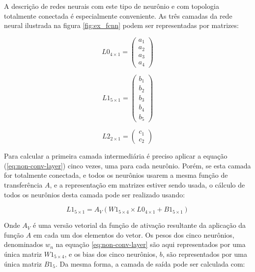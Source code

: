 A descrição de redes neurais com este tipo de neurônio e com topologia
totalmente conectada é especialmente conveniente. As três camadas
da rede neural ilustrada na figura \ref{fig:ex_fcnn} podem ser representadas
por matrizes:

\noindent\begin{minipage}{.333\linewidth}
	\begin{equation} \label{eq:l0}
		L0_{4 \times 1} =
			\begin{pmatrix}
				a_1 \\
				a_2 \\
				a_3 \\
				a_4
			\end{pmatrix}
	\end{equation}
\end{minipage}
\begin{minipage}{.333\linewidth}
	\begin{equation} \label{eq:l1}
		L1_{5 \times 1} =
			\begin{pmatrix}
				b_1 \\
				b_2 \\
				b_3 \\
				b_4 \\
				b_5
			\end{pmatrix}
	\end{equation}
\end{minipage}
\begin{minipage}{.333\linewidth}
	\begin{equation} \label{eq:l2}
		L2_{2 \times 1} =
			\begin{pmatrix}
				c_1 \\
				c_2
			\end{pmatrix}
	\end{equation}
\end{minipage}

Para calcular a primeira camada intermediária é preciso aplicar a equação
(\ref{eq:non-conv-layer}) cinco vezes, uma para cada neurônio. Porém, se
esta camada for totalmente conectada, e todos os neurônios usarem a
mesma função de transferência $A$, e a representação em matrizes estiver
sendo usada, o cálculo de todos os neurônios desta camada pode ser
realizado usando:

\begin{equation}
	L1_{5 \times 1}=A_V \left( W1_{5 \times 4} \times L0_{4 \times 1}
		+ B1_{5 \times 1} \right)
\end{equation}

Onde $A_V$ é uma versão vetorial da função de ativação resultante
da aplicação da função $A$ em cada um dos elementos do vetor.
Os pesos dos cinco neurônios, denominados $w_n$ na equação
\ref{eq:non-conv-layer} são aqui representados por uma única matriz
$W1_{5 \times 4}$, e os bias dos cinco neurônios, $b$, são representados por
uma única matriz $B1_5$. Da mesma forma, a camada de saída
pode ser calculada com:

